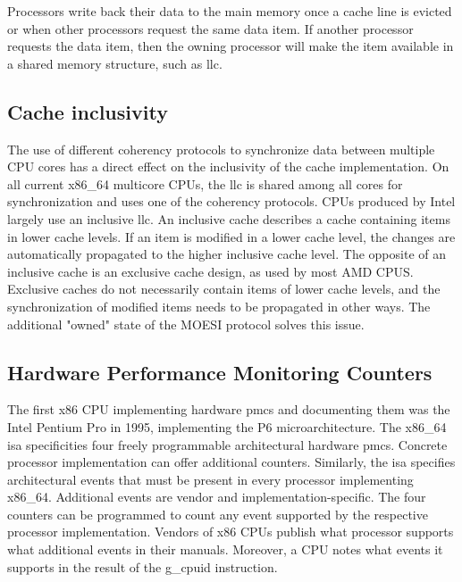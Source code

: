 Processors write back their data to the main memory once a cache line is evicted
or when other processors request the same data item. If another processor
requests the data item, then the owning processor will make the item available
in a shared memory structure, such as \gls{llc}.

\subsection{Cache inclusivity}
\label{sec:state:technical:caches_inclusivity}
The use of different coherency protocols to synchronize data between multiple
CPU cores has a direct effect on the inclusivity of the cache implementation. On
all current x86\_64 multicore CPUs, the \gls{llc} is shared among all cores for
synchronization and uses one of the coherency protocols. CPUs produced by Intel
largely use an inclusive \gls{llc}. An inclusive cache describes a cache
containing items in lower cache levels. If an item is modified in a lower cache
level, the changes are automatically propagated to the higher inclusive cache
level. The opposite of an inclusive cache is an exclusive cache design, as used
by most AMD CPUS. Exclusive caches do not necessarily contain items of lower
cache levels, and the synchronization of modified items needs to be propagated
in other ways. The additional "owned" state of the MOESI protocol solves this
issue.

\subsection{Hardware Performance Monitoring Counters}
\label{sec:state:technical:hpc}
The first x86 CPU implementing hardware \glspl{pmc} and
documenting them was the Intel Pentium Pro in 1995, implementing the P6
microarchitecture.\cite{intel_sdm} The x86\_64 \gls{isa} specificities
four freely programmable architectural hardware
\glspl{pmc}.\cite{amd_manual} Concrete processor implementation can offer
additional counters. Similarly, the \gls{isa} specifies architectural
events that must be present in every processor implementing x86\_64. Additional
events are vendor and implementation-specific. The four counters can be
programmed to count any event supported by the respective processor
implementation. Vendors of x86 CPUs publish what processor supports what
additional events in their manuals. Moreover, a CPU notes what events it
supports in the result of the \gls{g_cpuid} instruction. \\

